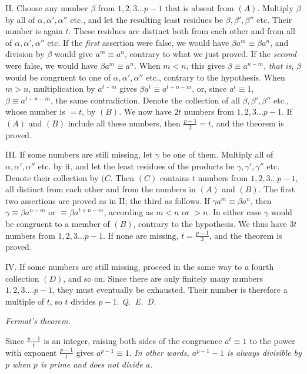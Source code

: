 II. Choose any number $\beta$ from $1,2,3...p-1$ that is absent from $(A)$. Multiply $\beta$ by all of $\alpha,\alpha',\alpha''$ etc., and let the resulting least residues be $\beta,\beta',\beta''$ etc. Their number is again $t$. These residues are distinct both from each other and from all of $\alpha,\alpha',\alpha''$ etc. If the \emph{first} assertion were false, we would have $\beta a^m\equiv\beta a^n$, and division by $\beta$ would give $a^m\equiv a^n$, contrary to what we just proved. If the \emph{second} were false, we would have $\beta a^m\equiv a^n$. When $m<n$, this gives $\beta\equiv a^{n-m}$, \emph{that is}, $\beta$ would be congruent to one of $\alpha,\alpha',\alpha''$ etc., contrary to the hypothesis. When $m>n$, multiplication by $a^{t-m}$ gives $\beta a^t\equiv a^{t+n-m}$, or, since $a^t\equiv1$, $\beta\equiv a^{t+n-m}$, the same contradiction. Denote the collection of all $\beta,\beta',\beta''$ etc., whose number is $=t$, by $(B)$. We now have $2t$ numbers from $1,2,3...p-1$. If $(A)$ and $(B)$ include all these numbers, then $\frac{p-1}{2}=t$, and the theorem is proved.

III. If some numbers are still missing, let $\gamma$ be one of them. Multiply all of $\alpha,\alpha',\alpha''$ etc. by it, and let the least residues of the products be $\gamma,\gamma',\gamma''$ etc. Denote their collection by $(C$. Then $(C)$ contains $t$ numbers from $1,2,3...p-1$, all distinct from each other and from the numbers in $(A)$ and $(B)$.
The first two assertions are proved as in II; the third as follows. If $\gamma a^m\equiv\beta a^n$, then $\gamma\equiv\beta a^{n-m}$ or $\equiv\beta a^{t+n-m}$, according as $m<n$ or $>n$. In either case $\gamma$ would be congruent to a member of $(B)$, contrary to the hypothesis. We thus have $3t$ numbers from $1,2,3...p-1$. If none are missing, $t=\frac{p-1}{3}$, and the theorem is proved.

IV. If some numbers are still missing, proceed in the same way to a fourth collection $(D)$, and so on. Since there are only finitely many numbers $1,2,3....p-1$, they must eventually be exhausted. Their number is therefore a multiple of $t$, so $t$ divides $p-1$. \mbox{\emph{Q. E. D.}}

\begin{center}\small\emph{Fermat's theorem.}\end{center}


Since $\frac{p-1}{t}$ is an integer, raising both sides of the congruence $a^t\equiv1$ to the power with exponent $\frac{p-1}{t}$ gives $a^{p-1}\equiv1$. \emph{In other words, $a^{p-1}-1$ is always divisible by $p$ when $p$ is prime and does not divide $a$.}

